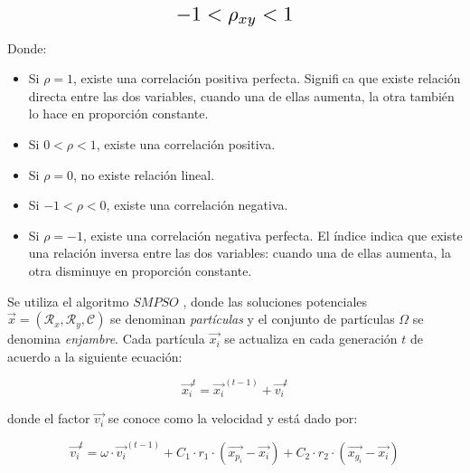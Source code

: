 \documentclass[spanish,twocolumn]{article}
\begin{document}
\begin{equation}\label{eq:gm}
\resizebox{.3\hsize}{!}
{
$-1<\rho_{xy}<1$ 
}
\end{equation}

Donde:
\begin{itemize}
\item Si $\rho = 1$, existe una correlación positiva perfecta. Significa que existe relación directa entre las dos variables, cuando una de ellas aumenta, la otra también lo hace en proporción constante.	
\item Si $0<\rho<1$, existe una correlación positiva.
\item Si $\rho= 0$, no existe relación lineal.
\item Si $-1<\rho<0$, existe una correlación negativa.
\item Si $\rho = -1$, existe una correlación negativa perfecta. El índice indica que existe una relación inversa entre las dos variables: cuando una de ellas aumenta, la otra disminuye en proporción constante.
\end{itemize}

Se utiliza el algoritmo $SMPSO$ \cite{nebro2009smpso}, donde las soluciones potenciales $\overrightarrow{x}=(\mathcal{R}_x, \mathcal{R}_y, \mathcal{C})$ se denominan {\it partículas} y el conjunto de partículas $\Omega$ se denomina {\it enjambre}. Cada partícula $\overrightarrow{x_i}$ se actualiza en cada generación $t$ de acuerdo a la siguiente ecuación:

\begin{equation}\label{eq:psobasico}
\overrightarrow{x_i}^t = \overrightarrow{x_i}^{(t-1)} + \overrightarrow{v_i}^t
\end{equation}

donde el factor $\overrightarrow{v_i}$ se conoce como la velocidad y está dado por:

\begin{equation}\label{eq:psobasico2}
\overrightarrow{v_i}^t = \omega \cdot \overrightarrow{v_i}^{(t-1)} + C_1 \cdot r_1 \cdot (\overrightarrow{x_{p_i}}-\overrightarrow{x_i}) + C_2 \cdot r_2 \cdot (\overrightarrow{x_{g_i}}-\overrightarrow{x_i})
\end{equation}
\end{document}
